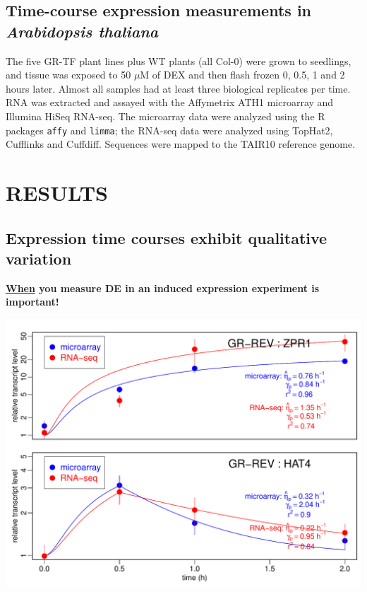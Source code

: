 \documentclass[aspb,landscape]{a0poster}
\newlength{\figwidth}
\newlength{\figtopspace}
\begin{document}
\begin{multicols}{3}
  \subsection*{Time-course expression measurements in {\it Arabidopsis thaliana}}

  The five GR-TF plant lines plus WT plants (all Col-0) were grown to seedlings, and tissue was exposed to 50 $\mu$M of DEX and then flash frozen 0, 0.5, 1 and 2 hours later.
  Almost all samples had at least three biological replicates per time. RNA was extracted and assayed with the Affymetrix ATH1 microarray and Illumina HiSeq RNA-seq.
  The microarray data were analyzed using the R packages \texttt{affy} and \texttt{limma}; the RNA-seq data were analyzed using TopHat2, Cufflinks and Cuffdiff.
  Sequences were mapped to the TAIR10 reference genome. 


  \section*{RESULTS}

  \subsection*{Expression time courses exhibit qualitative variation}

  \textbf{\underline{When} you measure DE in an induced expression experiment is important!}
  
  \begin{center}\vspace{\figtopspace}
    \includegraphics[width=\figwidth]{ZPR1-HAT4}
  \end{center}


\end{multicols}
\end{document}

